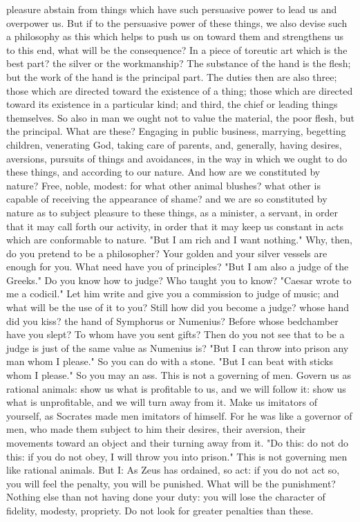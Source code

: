 \documentclass[a4paper]{article}
\begin{document}
pleasure abstain from things which have such persuasive power to lead us and
overpower us. But if to the persuasive power of these things, we also devise
such a philosophy as this which helps to push us on toward them and strengthens
us to this end, what will be the consequence? In a piece of toreutic art which
is the best part? the silver or the workmanship? The substance of the hand is
the flesh; but the work of the hand is the principal part. The duties then are
also three; those which are directed toward the existence of a thing; those
which are directed toward its existence in a particular kind; and third, the
chief or leading things themselves. So also in man we ought not to value the
material, the poor flesh, but the principal. What are these? Engaging in public
business, marrying, begetting children, venerating God, taking care of parents,
and, generally, having desires, aversions, pursuits of things and avoidances,
in the way in which we ought to do these things, and according to our nature.
And how are we constituted by nature? Free, noble, modest: for what other
animal blushes? what other is capable of receiving the appearance of shame? and
we are so constituted by nature as to subject pleasure to these things, as a
minister, a servant, in order that it may call forth our activity, in order
that it may keep us constant in acts which are conformable to nature.
    "But I am rich and I want nothing." Why, then, do you pretend to be a
philosopher? Your golden and your silver vessels are enough for you. What need
have you of principles? "But I am also a judge of the Greeks." Do you know how
to judge? Who taught you to know? "Caesar wrote to me a codicil." Let him write
and give you a commission to judge of music; and what will be the use of it to
you? Still how did you become a judge? whose hand did you kiss? the hand of
Symphorus or Numenius? Before whose bedchamber have you slept? To whom have you
sent gifts? Then do you not see that to be a judge is just of the same value as
Numenius is? "But I can throw into prison any man whom I please." So you can do
with a stone. "But I can beat with sticks whom I please." So you may an ass.
This is not a governing of men. Govern us as rational animals: show us what is
profitable to us, and we will follow it: show us what is unprofitable, and we
will turn away from it. Make us imitators of yourself, as Socrates made men
imitators of himself. For he was like a governor of men, who made them subject
to him their desires, their aversion, their movements toward an object and
their turning away from it. "Do this: do not do this: if you do not obey, I
will throw you into prison." This is not governing men like rational animals.
But I: As Zeus has ordained, so act: if you do not act so, you will feel the
penalty, you will be punished. What will be the punishment? Nothing else than
not having done your duty: you will lose the character of fidelity, modesty,
propriety. Do not look for greater penalties than these.
\end{document}
